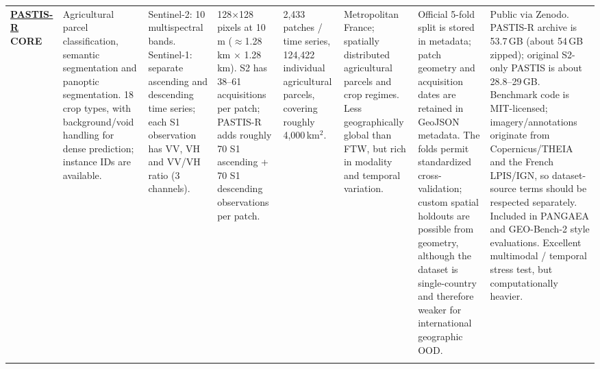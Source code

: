 \begin{landscape}
\begin{longtable}{
    Q{1.8cm}
    Q{2.5cm}
    Q{3.0cm}
    Q{2.5cm}
    Q{2.1cm}
    Q{3.0cm}
    Q{3.4cm}
    Q{3.4cm}
}
\href{https://github.com/VSainteuf/pastis-benchmark}{\textbf{PASTIS-R}}\newline
\textbf{CORE}
&
Agricultural parcel classification, semantic segmentation and panoptic segmentation. 18 crop types, with background/void handling for dense prediction; instance IDs are available.
&
Sentinel-2: 10 multispectral bands. Sentinel-1: separate ascending and descending time series; each S1 observation has VV, VH and VV/VH ratio (3 channels).
&
128$\times$128 pixels at 10\,m ($\approx$1.28\,km $\times$ 1.28\,km). S2 has 38--61 acquisitions per patch; PASTIS-R adds roughly 70 S1 ascending + 70 S1 descending observations per patch.
&
2,433 patches / time series, 124,422 individual agricultural parcels, covering roughly 4,000\,km$^2$.
&
Metropolitan France; spatially distributed agricultural parcels and crop regimes. Less geographically global than FTW, but rich in modality and temporal variation.
&
Official 5-fold split is stored in metadata; patch geometry and acquisition dates are retained in GeoJSON metadata. The folds permit standardized cross-validation; custom spatial holdouts are possible from geometry, although the dataset is single-country and therefore weaker for international geographic OOD.
&
Public via Zenodo. PASTIS-R archive is 53.7\,GB (about 54\,GB zipped); original S2-only PASTIS is about 28.8--29\,GB. Benchmark code is MIT-licensed; imagery/annotations originate from Copernicus/THEIA and the French LPIS/IGN, so dataset-source terms should be respected separately. Included in PANGAEA and GEO-Bench-2 style evaluations. Excellent multimodal / temporal stress test, but computationally heavier.
\\
\addlinespace


\end{longtable}
\end{landscape}
